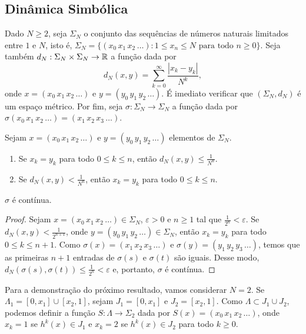 \subsection{Dinâmica Simbólica}

Dado $N \geq 2$, seja $\Sigma_N$ o conjunto das sequências de números naturais limitados entre $1$ e $N$, isto é, $\Sigma_N = \lbrace (x_0 \, x_1 \, x_2 \, \dots) : 1 \leq x_n \leq N  \text{ para todo } n \geq 0 \rbrace$.
Seja também $d_N : \Sigma_N \times \Sigma_N \to \mathbb{R}$ a função dada por
$$d_N(x, y) = \sum_{k=0}^\infty \frac{|x_k - y_k|}{N^k},$$
onde $x = (x_0 \, x_1 \, x_2 \, \dots)$ e $y = (y_0 \, y_1 \, y_2 \, \dots)$.
É imediato verificar que $(\Sigma_N, d_N)$ é um espaço métrico.
Por fim, seja $\sigma: \Sigma_N \to \Sigma_N$ a função dada por $\sigma(x_0 \, x_1 \, x_2 \, \dots) = (x_1 \, x_2 \, x_3 \, \dots)$.

\begin{proposition}
Sejam $x = (x_0 \, x_1 \, x_2 \, \dots)$ e $y = (y_0 \, y_1 \, y_2 \, \dots)$ elementos de $\Sigma_N$.
\begin{enumerate}
\item Se $x_k = y_k$ para todo $0 \leq k \leq n$, então $d_N(x, y) \leq \frac{1}{N^n}$.
\item Se $d_N(x, y) < \frac{1}{N^n}$, então $x_k = y_k$ para todo $0 \leq k \leq n$.
\end{enumerate}
\end{proposition}

\begin{proposition}
$\sigma$ é contínua.
\end{proposition}

\begin{proof}
Sejam $x = (x_0 \, x_1 \, x_2 \, \dots) \in \Sigma_N$, $\varepsilon > 0$ e $n \geq 1$ tal que $\frac{1}{2^n} < \varepsilon$.
Se $d_N(x, y) < \frac{1}{2^{n+1}}$, onde $y = (y_0 \, y_1 \, y_2 \, \dots) \in \Sigma_N$, então $x_k = y_k$ para todo $0 \leq k \leq n+1$.
Como $\sigma(x) = (x_1 \, x_2 \, x_3  \, \dots)$ e $\sigma(y) = (y_1 \, y_2 \, y_3 \, \dots)$, temos que as primeiras $n+1$ entradas de $\sigma(s)$ e $\sigma(t)$ são iguais. Desse modo,  $d_N(\sigma(s), \sigma(t)) \leq \frac{1}{2^n} < \varepsilon$ e, portanto, $\sigma$ é contínua.
\end{proof}

Para a demonstração do próximo resultado, vamos considerar $N = 2$.
Se $\Lambda_1 = [0, x_1] \cup [x_2, 1]$, sejam $J_1 = [0, x_1]$ e $J_2 = [x_2, 1]$.
Como $\Lambda \subset J_1 \cup J_2$, podemos definir a função $S: \Lambda \to \Sigma_2$ dada por $S(x) = (x_0 \, x_1 \, x_2 \, \dots)$, onde $x_k = 1$ se $h^k(x) \in J_1$ e $x_k = 2$ se $h^k(x) \in J_2$ para todo $k \geq 0$.

